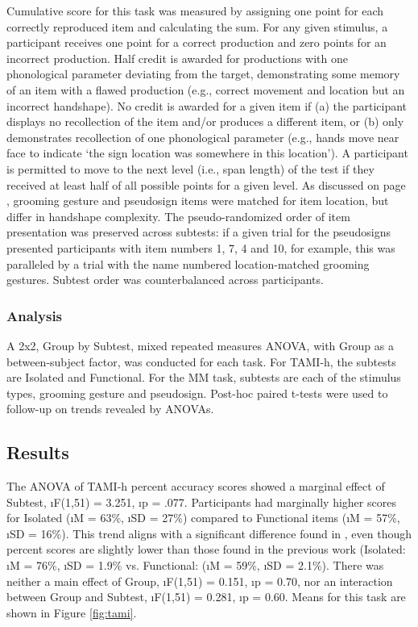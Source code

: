             Cumulative score for this task was measured by assigning one point for each correctly reproduced item and calculating the sum. For any given stimulus, a participant receives one point for a correct production and zero points for an incorrect production. Half credit is awarded for productions with one phonological parameter deviating from the target, demonstrating some memory of an item with a flawed production (e.g., correct movement and location but an incorrect handshape). No credit is awarded for a given item if (a) the participant displays no recollection of the item and/or produces a different item, or (b) only demonstrates recollection of one phonological parameter (e.g., hands move near face to indicate ‘the sign location was somewhere in this location’). A participant is permitted to move to the next level (i.e., span length) of the test if they received at least half of all possible points for a given level. As discussed on page \pageref{par:hs_complexity}, grooming gesture and pseudosign items were matched for item location, but differ in handshape complexity. The pseudo-randomized order of item presentation was preserved across subtests: if a given trial for the pseudosigns presented participants with item numbers 1, 7, 4 and 10, for example, this was paralleled by a trial with the name numbered location-matched grooming gestures. Subtest order was counterbalanced across participants. \par
\subsubsection{Analysis}
            A 2x2, Group by Subtest, mixed repeated measures ANOVA, with Group as a between-subject factor, was conducted for each task. For TAMI-h, the subtests are Isolated and Functional. For the MM task, subtests are each of the stimulus types, grooming gesture and pseudosign. Post-hoc paired t-tests were used to follow-up on trends revealed by ANOVAs.\par
    \subsection{Results}
            The ANOVA of TAMI-h percent accuracy scores showed a marginal effect of Subtest, \i{F}(1,51) = 3.251, \i{p} = .077. Participants had marginally higher scores for Isolated (\i{M} = 63\%, \i{SD} = 27\%) compared to Functional items (\i{M} = 57\%, \i{SD} = 16\%). This trend aligns with a significant difference found in , even though percent scores are slightly lower than those found in the previous work (Isolated: \i{M} = 76\%, \i{SD} = 1.9\% vs. Functional: (\i{M} = 59\%, \i{SD} = 2.1\%). There was neither a main effect of Group, \i{F}(1,51) = 0.151, \i{p} = 0.70, nor an interaction between Group and Subtest, \i{F}(1,51) = 0.281, \i{p} = 0.60. Means for this task are shown in Figure \ref{fig:tami}.\par

